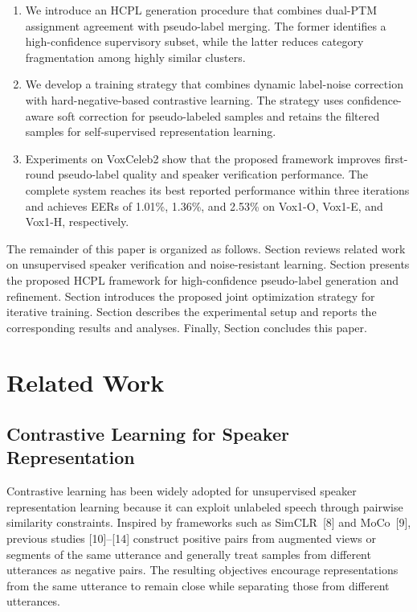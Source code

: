 \documentclass[lettersize,journal]{IEEEtran}
\begin{document}
\begin{enumerate}
    \item We introduce an HCPL generation procedure that combines
    dual-PTM assignment agreement with pseudo-label merging. The
    former identifies a high-confidence supervisory subset, while
    the latter reduces category fragmentation among highly similar
    clusters.

    \item We develop a training strategy that combines dynamic
    label-noise correction with hard-negative-based contrastive
    learning. The strategy uses confidence-aware soft correction for
    pseudo-labeled samples and retains the filtered samples for
    self-supervised representation learning.

    \item Experiments on VoxCeleb2 show that the proposed framework
    improves first-round pseudo-label quality and speaker
    verification performance. The complete system reaches its best
    reported performance within three iterations and achieves EERs
    of 1.01\%, 1.36\%, and 2.53\% on Vox1-O, Vox1-E, and Vox1-H,
    respectively.
\end{enumerate}


The remainder of this paper is organized as follows. Section \uppercase\expandafter{} reviews related work on unsupervised speaker verification and noise-resistant learning. Section \uppercase\expandafter{} presents the proposed HCPL framework for high-confidence pseudo-label generation and refinement. Section \uppercase\expandafter{} introduces the proposed joint optimization strategy for iterative training. Section \uppercase\expandafter{} describes the experimental setup and reports the corresponding results and analyses. Finally, Section \uppercase\expandafter{} concludes this paper.

\section{Related Work}

\subsection{Contrastive Learning for Speaker Representation}

Contrastive learning has been widely adopted for unsupervised
speaker representation learning because it can exploit unlabeled
speech through pairwise similarity constraints. Inspired by
frameworks such as SimCLR~[8] and MoCo~[9], previous studies
[10]--[14] construct positive pairs from augmented views or segments
of the same utterance and generally treat samples from different
utterances as negative pairs. The resulting objectives encourage
representations from the same utterance to remain close while
separating those from different utterances.
\end{document}
